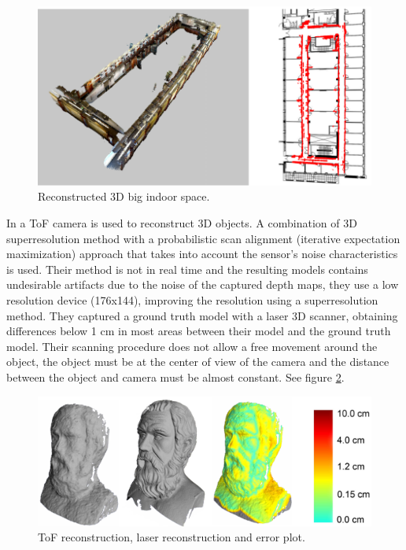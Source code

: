 \begin{figure}[h!]
\begin{center}
\includegraphics[scale=0.29]{images/henry}\caption{Reconstructed 3D big indoor space.}
\label{fig:henry}
\end{center}
\end{figure}

%
In \cite{cui} a ToF camera is used to reconstruct 3D objects. A combination of 3D superresolution method with a 
probabilistic scan alignment (iterative expectation maximization) approach that takes into account the sensor's 
noise characteristics is used. Their method is not in real time and the resulting models contains undesirable 
artifacts due to  the noise of the captured depth maps, they use a low resolution device (176x144), 
improving the resolution using a superresolution method. They captured a ground truth model with a laser 3D scanner, 
obtaining differences below 1 cm in most areas between their model and the ground truth model. Their scanning 
procedure does not allow a free movement around the object, the object must be at the center of view of the camera 
and the distance between the object and camera must be almost constant. See figure \ref{fig:cui}.

\begin{figure}[h!]
\begin{center}
\includegraphics[scale=0.23]{images/cui}
\caption{ToF reconstruction, laser reconstruction and error plot.}
\label{fig:cui}
\end{center}
\end{figure}

